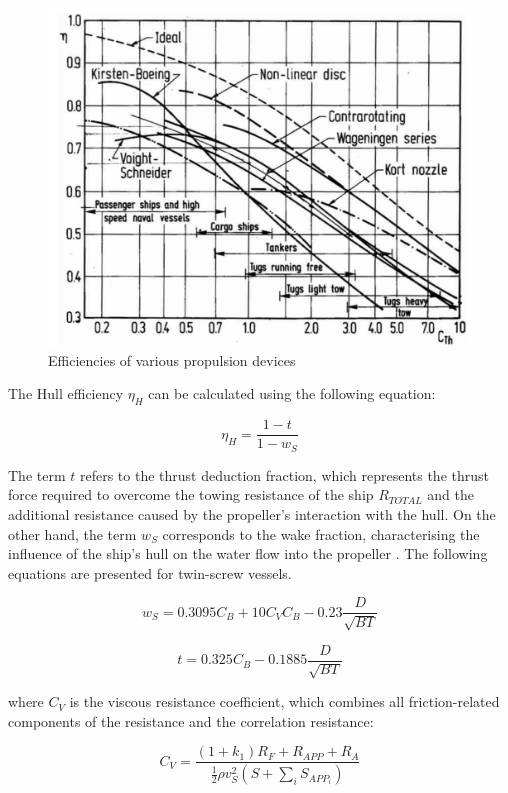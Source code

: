 \documentclass[]{interact}
\theoremstyle{plain}%
\theoremstyle{definition}
\theoremstyle{remark}
\begin{document}
\begin{figure}
  \centering
  \includegraphics[width=.5\textwidth]{00_figures/Breslin94_openwater_eff.jpg}
  \caption{Efficiencies of various propulsion devices \citep{Breslin.1994}}
  \label{fig:breslin_open water efficiencies}
\end{figure}

The Hull efficiency $\eta_H$ can be calculated using the following equation:

\begin{equation}
    \label{eqn:hull_eff}
    \eta_H = \frac{1 - t}{1 - w_S}
\end{equation}

The term $t$ refers to the thrust deduction fraction, which represents the thrust force required to overcome the towing resistance of the ship $R_{TOTAL}$ and the additional resistance caused by the propeller's interaction with the hull. On the other hand, the term $w_S$ corresponds to the wake fraction, characterising the influence of the ship's hull on the water flow into the propeller \citep{Diesel.2011,Birk.2019}. The following equations are presented for twin-screw vessels.

\begin{equation}
    \label{eqn:wake_ws}
    w_S = 0.3095 C_B + 10 C_V C_B -0.23 \frac{D}{\sqrt{BT}}
\end{equation}

\begin{equation}
    \label{eqn:thrust_t}
    t = 0.325 C_B - 0.1885 \frac{D}{\sqrt{BT}}
\end{equation}

where $C_V$ is the viscous resistance coefficient, which combines all friction-related components of the resistance and the correlation resistance:

\begin{equation}
    \label{eqn:C_V}
    C_V = \frac{(1+k_1)R_F+R_{APP}+R_A}{\frac{1}{2}\rho v_S^2 (S+\sum_i S_{APP_i})}
\end{equation}
\end{document}
